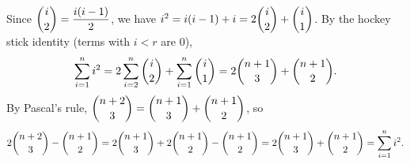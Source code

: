 Since $\dbinom i2=\dfrac{i(i-1)}{2}$, we have $i^2=i(i-1)+i=2\dbinom i2+\dbinom i1$. By the hockey stick identity (terms with $i<r$ are $0$),
\[\sum_{i=1}^{n}i^2=2\sum_{i=2}^{n}\dbinom i2+\sum_{i=1}^{n}\dbinom i1=2\dbinom{n+1}{3}+\dbinom{n+1}{2}.\]
By Pascal's rule, $\dbinom{n+2}{3}=\dbinom{n+1}{3}+\dbinom{n+1}{2}$, so
\[2\dbinom{n+2}{3}-\dbinom{n+1}{2}=2\dbinom{n+1}{3}+2\dbinom{n+1}{2}-\dbinom{n+1}{2}=2\dbinom{n+1}{3}+\dbinom{n+1}{2}=\sum_{i=1}^{n}i^2 .\]
